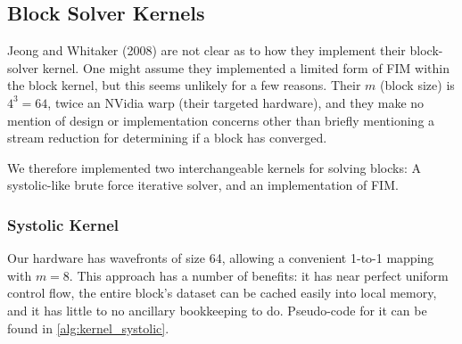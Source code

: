 \documentclass[11pt]{article}       %
\begin{document}
\subsection{Block Solver Kernels} \label{sec:block_kernels}

Jeong and Whitaker (2008)\cite{jeong2008fast} are not clear as to how they implement their block-solver kernel. One might assume they implemented a limited form of FIM within the block kernel, but this seems unlikely for a few reasons. Their $m$ (block size) is $4^3 = 64$, twice an NVidia warp (their targeted hardware), and they make no mention of design or implementation concerns other than briefly mentioning a stream reduction for determining if a block has converged.

We therefore implemented two interchangeable kernels for solving blocks: A systolic-like brute force iterative solver, and an implementation of FIM.


\subsubsection{Systolic Kernel}\label{sec:kernel_systolic}

Our hardware has wavefronts of size 64, allowing a convenient 1-to-1 mapping with $m = 8$. This approach has a number of benefits: it has near perfect uniform control flow, the entire block's dataset can be cached easily into local memory, and it has little to no ancillary bookkeeping to do. Pseudo-code for it can be found in \autoref{alg:kernel_systolic}.
\end{document}
